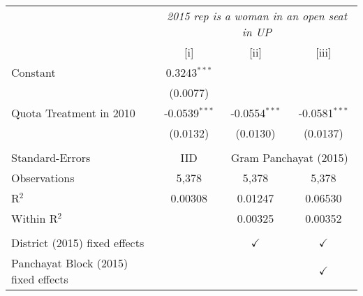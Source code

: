 
\begingroup
\centering
\begin{tabular}{lccc}
   \toprule
    & \multicolumn{3}{c}{\textit{2015 rep is a woman in an open seat in UP}}\\
                                        & [i]             & [ii]            & [iii]\\  
   \midrule 
   Constant                             & 0.3243$^{***}$  &                 &   \\   
                                        & (0.0077)        &                 &   \\   
   Quota Treatment in 2010              & -0.0539$^{***}$ & -0.0554$^{***}$ & -0.0581$^{***}$\\   
                                        & (0.0132)        & (0.0130)        & (0.0137)\\   
    \\
   Standard-Errors & IID & \multicolumn{2}{c}{Gram Panchayat (2015)} \\ 
   Observations                         & 5,378           & 5,378           & 5,378\\  
   R$^2$                                & 0.00308         & 0.01247         & 0.06530\\  
   Within R$^2$                         &                 & 0.00325         & 0.00352\\  
    \\
   District (2015) fixed effects        &                 & $\checkmark$    & $\checkmark$\\   
   Panchayat Block (2015) fixed effects &                 &                 & $\checkmark$\\   
   \bottomrule
\end{tabular}
\par\endgroup


